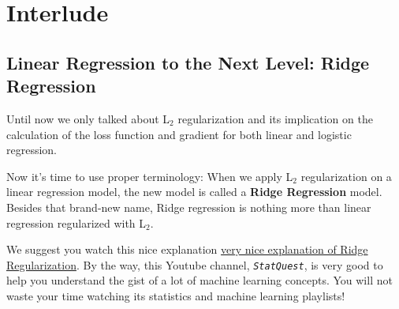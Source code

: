 
\section*{Interlude}
\subsection*{Linear Regression to the Next Level: Ridge Regression}

Until now we only talked about L$_2$ regularization and its implication on the calculation of the loss function and gradient for both linear and logistic regression.

Now it's time to use proper terminology:
When we apply L$_2$ regularization on a linear regression model, the new model is called a \textbf{Ridge Regression} model.
Besides that brand-new name, Ridge regression is nothing more than linear regression regularized with L$_2$.

We suggest you watch this nice explanation \href{https://www.youtube.com/watch?v=Q81RR3yKn30}{very nice explanation of Ridge Regularization}.
By the way, this Youtube channel, \texttt{\textit{StatQuest}}, is very good to help you understand the gist of a lot of machine learning concepts.
You will not waste your time watching its statistics and machine learning playlists!
